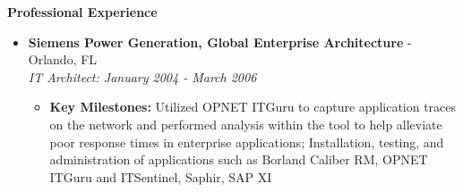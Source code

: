 \documentclass[10pt,oneside]{article}
\newenvironment{ressection}[1]{
  \vspace{4pt}
  \textbf{\selectfont\normalsize#1}
  \begin{itemize}
  \vspace{3pt}
}{
  \end{itemize}
}
\newcommand{\ressubitem}[1]{
  \vspace{-1pt}
  \item \begin{flushleft} #1 \end{flushleft}
}
\newcommand{\resbigitem}[3]{
  \vspace{-5pt}
  \item
  \textbf{#1} - #2 \\
  \textit{#3}
}
\newenvironment{ressubsec}[3]{
  \resbigitem{#1}{#2}{#3}
  \vspace{-2pt}
  \begin{itemize}
}{
  \end{itemize}
}
\begin{document}
\begin{ressection}{Professional Experience}
\begin{ressubsec}{Siemens Power Generation, Global Enterprise Architecture}{Orlando, FL}{IT Architect: January 2004 - March 2006}
    \ressubitem{\textbf{Key Milestones:} Utilized OPNET ITGuru to capture application traces on the network and performed analysis within the tool to help alleviate poor response times in enterprise applications; Installation, testing, and administration of applications such as Borland Caliber RM, OPNET ITGuru and ITSentinel, Saphir, SAP XI}
    
  \end{ressubsec}







\end{ressection}

\end{document}
